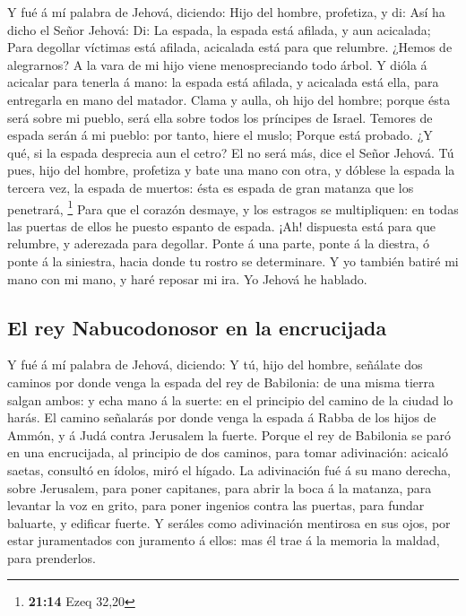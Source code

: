  Y fué á mí palabra de Jehová, diciendo: 
Hijo del hombre, profetiza, y di: Así ha dicho el Señor Jehová: Di: La
espada, la espada está afilada, y aun acicalada;  Para
degollar víctimas está afilada, acicalada está para que relumbre. ¿Hemos
de alegrarnos? A la vara de mi hijo viene menospreciando todo árbol.
 Y dióla á acicalar para tenerla á mano: la espada está
afilada, y acicalada está ella, para entregarla en mano del matador.
 Clama y aulla, oh hijo del hombre; porque ésta será
sobre mi pueblo, será ella sobre todos los príncipes de Israel. Temores
de espada serán á mi pueblo: por tanto, hiere el muslo; 
Porque está probado. ¿Y qué, si la espada desprecia aun el cetro? El no
será más, dice el Señor Jehová.  Tú pues, hijo del
hombre, profetiza y bate una mano con otra, y dóblese la espada la
tercera vez, la espada de muertos: ésta es espada de gran matanza que
los penetrará, \footnote{\textbf{21:14} Ezeq 32,20}  Para
que el corazón desmaye, y los estragos se multipliquen: en todas las
puertas de ellos he puesto espanto de espada. ¡Ah! dispuesta está para
que relumbre, y aderezada para degollar.  Ponte á una
parte, ponte á la diestra, ó ponte á la siniestra, hacia donde tu rostro
se determinare.  Y yo también batiré mi mano con mi mano,
y haré reposar mi ira. Yo Jehová he hablado.

\hypertarget{el-rey-nabucodonosor-en-la-encrucijada}{%
\subsection{El rey Nabucodonosor en la
encrucijada}\label{el-rey-nabucodonosor-en-la-encrucijada}}

 Y fué á mí palabra de Jehová, diciendo: 
Y tú, hijo del hombre, señálate dos caminos por donde venga la espada
del rey de Babilonia: de una misma tierra salgan ambos: y echa mano á la
suerte: en el principio del camino de la ciudad lo harás.
 El camino señalarás por donde venga la espada á Rabba de
los hijos de Ammón, y á Judá contra Jerusalem la fuerte. 
Porque el rey de Babilonia se paró en una encrucijada, al principio de
dos caminos, para tomar adivinación: acicaló saetas, consultó en ídolos,
miró el hígado.  La adivinación fué á su mano derecha,
sobre Jerusalem, para poner capitanes, para abrir la boca á la matanza,
para levantar la voz en grito, para poner ingenios contra las puertas,
para fundar baluarte, y edificar fuerte.  Y seráles como
adivinación mentirosa en sus ojos, por estar juramentados con juramento
á ellos: mas él trae á la memoria la maldad, para prenderlos.


